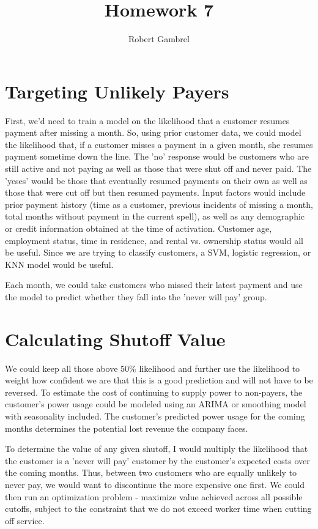 \documentclass[]{article}
\title{Homework 7}
\author{Robert Gambrel}
\begin{document}
\maketitle


\section{Targeting Unlikely Payers}
\begin{large}
First, we'd need to train a model on the likelihood that a customer resumes payment after missing a month. So, using prior customer data, we could model the likelihood that, if a customer misses a payment in a given month, she resumes payment sometime down the line. The 'no' response would be customers who are still active and not paying as well as those that were shut off and never paid. The 'yeses' would be those that eventually resumed payments on their own as well as those that were cut off but then resumed payments. Input factors would include prior payment history (time as a customer, previous incidents of missing a month, total months without payment in the current spell), as well as any demographic or credit information obtained at the time of activation. Customer age, employment status, time in residence, and rental vs. ownership status would all be useful. Since we are trying to classify customers, a SVM, logistic regression, or KNN model would be useful.

Each month, we could take customers who missed their latest payment and use the model to predict whether they fall into the 'never will pay' group. 

\section{Calculating Shutoff Value}

We could keep all those above 50\% likelihood and further use the likelihood to weight how confident we are that this is a good prediction and will not have to be reversed. To estimate the cost of continuing to supply power to non-payers, the customer's power usage could be modeled using an ARIMA or smoothing model with seasonality included. The customer's predicted power usage for the coming months determines the potential lost revenue the company faces.

To determine the value of any given shutoff, I would multiply the likelihood that the customer is a 'never will pay' customer by the customer's expected costs over the coming months. Thus, between two customers who are equally unlikely to never pay, we would want to discontinue the more expensive one first. We could then run an optimization problem - maximize value achieved across all possible cutoffs, subject to the constraint that we do not exceed worker time when cutting off service.


\end{large}
\end{document}
